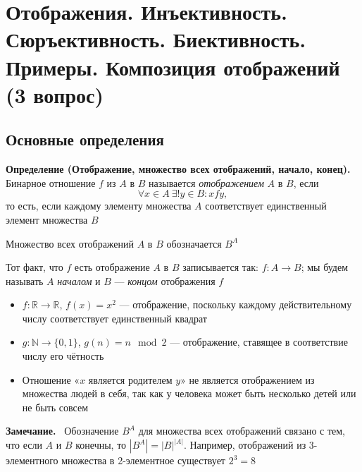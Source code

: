 \documentclass[a4paper,12pt]{article}
\newcommand{\myremark}{\textbf{Замечание.}\ }
\theoremstyle{definition}
\theoremstyle{plain}
\theoremstyle{remark}
\begin{document}
	
	
	
	
	
	
	
	
	
	
	

	
	
	
	\newpage
	\section{Отображения. Инъективность. Сюръективность. Биективность. Примеры. Композиция отображений (3 вопрос)}
	
	\subsection{Основные определения}
	
	\noindent \textbf{Определение (Отображение, множество всех отображений, начало, конец).}
	Бинарное отношение $f$ из $A$ в $B$ называется \textit{отображением} $A$ в $B$, если
	\[
	\forall x \in A \ \exists! y \in B \colon x f y,
	\]
	то есть, если каждому элементу множества $A$ соответствует единственный элемент множества $B$
	
	\medskip
	Множество всех отображений $A$ в $B$ обозначается $B^A$
	
	\medskip
	Тот факт, что $f$ есть отображение $A$ в $B$ записывается так: $f \colon A \to B$; мы будем называть $A$ \textit{началом} и $B$ — \textit{концом} отображения $f$
	
	\begin{tcolorbox}[colback=gray!5, colframe=gray!50, title=Примеры отображений]
		\begin{itemize}
			\item $f \colon \mathbb{R} \to \mathbb{R}$, $f(x) = x^2$ — отображение, поскольку каждому действительному числу соответствует единственный квадрат
			\item $g \colon \mathbb{N} \to \{0,1\}$, $g(n) = n \mod 2$ — отображение, ставящее в соответствие числу его чётность
			\item Отношение «$x$ является родителем $y$» не является отображением из множества людей в себя, так как у человека может быть несколько детей или не быть совсем
		\end{itemize}
	\end{tcolorbox}
	
	\myremark
	Обозначение $B^A$ для множества всех отображений связано с тем, что если $A$ и $B$ конечны, то $|B^A| = |B|^{|A|}$. Например, отображений из 3-элементного множества в 2-элементное существует $2^3 = 8$
	
\end{document}
